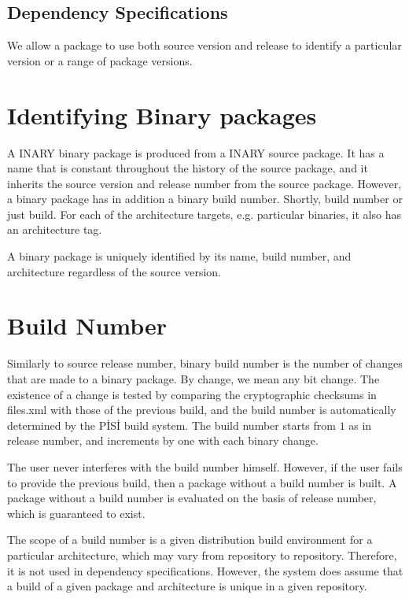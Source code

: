 \documentclass[a4paper,11pt]{article}
\begin{document}
\subsection{Dependency Specifications}

We allow a package to use both source version and release to identify
a particular version or a range of package versions.

\section{Identifying Binary packages}

A INARY binary package is produced from a INARY source package. It has a
name that is constant throughout the history of the source package,
and it inherits the source version and release number from the source
package. However, a binary package has in addition a binary build
number. Shortly, build number or just build. For each of the
architecture targets, e.g. particular binaries, it also has an
architecture tag.

A binary package is uniquely identified by its name, build number, and
architecture regardless of the source version.

\section{Build Number}

Similarly to source release number, binary build number is the number
of changes that are made to a binary package. By change, we mean any
bit change.  The existence of a change is tested by comparing the
cryptographic checksums in files.xml with those of the previous build, and the
build number is automatically determined by the P\.IS\.I build system.
The build number starts from $1$ as in release number, and increments
by one with each binary change.

The user never interferes with the build number himself. However, if
the user fails to provide the previous build, then a package without
a build number is built. A package without a build number is evaluated
on the basis of release number, which is guaranteed to exist.

The scope of a build number is a given distribution build environment
for a particular architecture, which may vary from repository to
repository. Therefore, it is not used in dependency
specifications. However, the system does assume that a build of a
given package and architecture is unique in a given repository.
\end{document}
